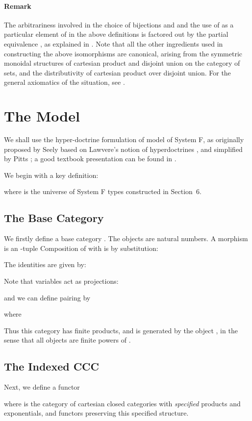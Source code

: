 \documentclass[a4paper,11pt]{article}
\begin{document}
\paragraph{Remark} The arbitrariness involved in the choice of
bijections  and  and the use of  as  a particular element of 
in the above definitions is factored out by the partial equivalence
, as explained in \cite{AJM00}.
Note that all the other ingredients used in constructing the above
isomorphisms are canonical, arising from the symmetric monoidal
structures of cartesian product and disjoint union on the category of sets, and the
distributivity of cartesian product over disjoint union. For the
general axiomatics of the situation, see \cite{AHS02}.

\section{The Model}

We shall use the hyper-doctrine formulation of model of System F, as
originally proposed by Seely \cite{See87} based on Lawvere's notion
of hyperdoctrines \cite{Law70}, and simplified by Pitts \cite{Pit88};
a good textbook presentation can be found in \cite{Cro93}.

We begin with a key definition:

where  is the universe of System F types constructed in Section~6.

\subsection{The Base Category}
We firstly define a base category . The objects are natural
numbers. A morphism  is an -tuple
 Composition of  with  is by substitution:

The identities are given by:

Note that variables act as projections:

and we can define pairing by

where

Thus this category has finite products, and is generated by the object
, in the sense that all objects are finite powers of .


\subsection{The Indexed CCC}
Next, we define a functor

where  is the category of cartesian closed categories with
\emph{specified} products and exponentials, and functors preserving
this specified structure.
\end{document}
